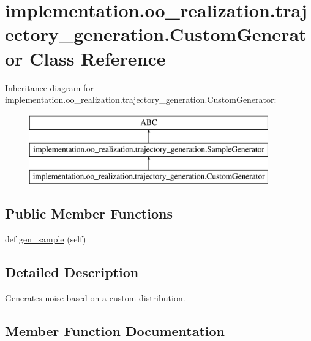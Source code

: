 \hypertarget{classimplementation_1_1oo__realization_1_1trajectory__generation_1_1_custom_generator}{}\section{implementation.\+oo\+\_\+realization.\+trajectory\+\_\+generation.\+Custom\+Generator Class Reference}
\label{classimplementation_1_1oo__realization_1_1trajectory__generation_1_1_custom_generator}
Inheritance diagram for implementation.\+oo\+\_\+realization.\+trajectory\+\_\+generation.\+Custom\+Generator\+:\begin{figure}[H]
\begin{center}
\leavevmode
\includegraphics[height=3.000000cm]{classimplementation_1_1oo__realization_1_1trajectory__generation_1_1_custom_generator}
\end{center}
\end{figure}
\subsection*{Public Member Functions}
\begin{DoxyCompactItemize}
\item 
def \hyperlink{classimplementation_1_1oo__realization_1_1trajectory__generation_1_1_custom_generator_ab40922c70a86fe05750b672c1b7c444f}{gen\+\_\+sample} (self)
\end{DoxyCompactItemize}


\subsection{Detailed Description}
\begin{DoxyVerb}Generates noise based on a custom distribution.
\end{DoxyVerb}
 

\subsection{Member Function Documentation}
\mbox{\label{classimplementation_1_1oo__realization_1_1trajectory__generation_1_1_custom_generator_ab40922c70a86fe05750b672c1b7c444f}} 
